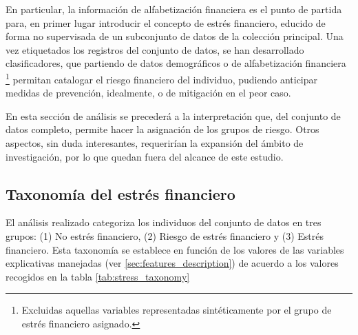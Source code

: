 \documentclass[a4paper, 11pt]{article}
\begin{document}
En particular, la información de alfabetización financiera es el punto de partida para, en primer
lugar introducir el concepto de estrés financiero, educido de forma no supervisada de un subconjunto
de datos de la colección principal. Una vez etiquetados los registros del conjunto de datos, se 
han desarrollado clasificadores, que partiendo de datos demográficos o de alfabetización financiera
\footnote{Excluidas aquellas variables representadas sintéticamente por el grupo de estrés financiero
asignado.} permitan catalogar el riesgo financiero del individuo, pudiendo anticipar medidas de 
prevención, idealmente, o de mitigación en el peor caso.

En esta sección de análisis se precederá a la interpretación que, del conjunto de datos completo, 
permite hacer la asignación de los grupos de riesgo. Otros aspectos, sin duda interesantes, 
requerirían la expansión del ámbito de investigación, por lo que quedan fuera del alcance de
este estudio.
\subsection{Taxonomía del estrés financiero}
\label{sec:financial_stress_taxonomy}

El análisis realizado categoriza los individuos del conjunto de datos en tres grupos:
(1) No estrés financiero, (2) Riesgo de estrés financiero y (3) Estrés financiero. Esta
taxonomía se establece en función de los valores de las variables explicativas manejadas
(ver \ref{sec:features_description}) de acuerdo a los valores recogidos en la tabla 
\ref{tab:stress_taxonomy}
\end{document}
